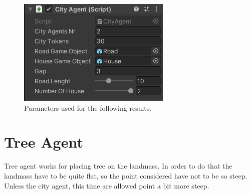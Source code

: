 \documentclass[12pt]{article}
\begin{document}
    \begin{figure}[H]
        \centering
        \includegraphics[scale = 0.8]{images/City Agent/2/Parameters}
        \caption{Parameters used for the following results.}
    \end{figure}

    \begin{figure}[H]
        \centering     %
    \end{figure}

    \newpage

    \section{Tree Agent}
    Tree agent works for placing tree on the landmass. In order to do that the landmass have to be quite flat, so the point considered have not to be so steep. Unless the city agent,
    this time are allowed point a bit more steep. 
\end{document}
